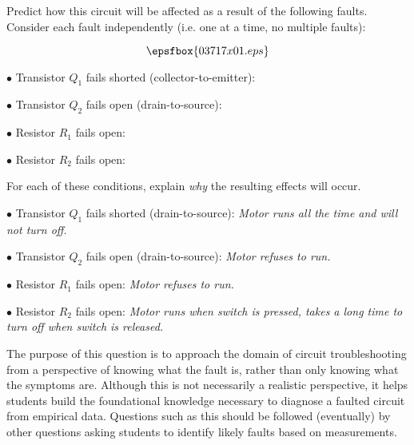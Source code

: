 

Predict how this circuit will be affected as a result of the following faults.  Consider each fault independently (i.e. one at a time, no multiple faults):

$$\epsfbox{03717x01.eps}$$

\medskip
\item{$\bullet$} Transistor $Q_1$ fails shorted (collector-to-emitter):
\vskip 5pt
\item{$\bullet$} Transistor $Q_2$ fails open (drain-to-source):
\vskip 5pt
\item{$\bullet$} Resistor $R_1$ fails open:
\vskip 5pt
\item{$\bullet$} Resistor $R_2$ fails open:
\medskip

For each of these conditions, explain {\it why} the resulting effects will occur.







\medskip
\item{$\bullet$} Transistor $Q_1$ fails shorted (drain-to-source): {\it Motor runs all the time and will not turn off.}
\vskip 5pt
\item{$\bullet$} Transistor $Q_2$ fails open (drain-to-source): {\it Motor refuses to run.}
\vskip 5pt
\item{$\bullet$} Resistor $R_1$ fails open: {\it Motor refuses to run.}
\vskip 5pt
\item{$\bullet$} Resistor $R_2$ fails open: {\it Motor runs when switch is pressed, takes a long time to turn off when switch is released.}
\medskip







The purpose of this question is to approach the domain of circuit troubleshooting from a perspective of knowing what the fault is, rather than only knowing what the symptoms are.  Although this is not necessarily a realistic perspective, it helps students build the foundational knowledge necessary to diagnose a faulted circuit from empirical data.  Questions such as this should be followed (eventually) by other questions asking students to identify likely faults based on measurements.




